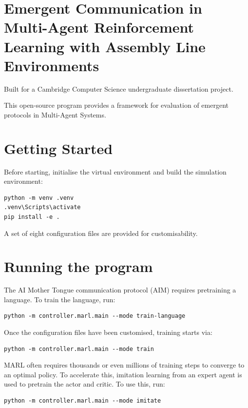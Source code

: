 \label{sec:README}
\section{Emergent Communication in Multi-Agent Reinforcement Learning with Assembly Line Environments}

Built for a Cambridge Computer Science undergraduate dissertation project.

This open-source program provides a framework for evaluation of emergent protocols in Multi-Agent Systems.

\section{Getting Started}

Before starting, initialise the virtual environment and build the simulation environment:

\begin{verbatim}
python -m venv .venv
.venv\Scripts\activate
pip install -e .
\end{verbatim}

A set of eight configuration files are provided for customisability.

\section{Running the program}

The AI Mother Tongue communication protocol (AIM) requires pretraining a language. To train the language, run:

\begin{verbatim}
python -m controller.marl.main --mode train-language
\end{verbatim}

Once the configuration files have been customised, training starts via:

\begin{verbatim}
python -m controller.marl.main --mode train
\end{verbatim}

MARL often requires thousands or even millions of training steps to converge to an optimal policy. To accelerate this, imitation learning from an expert agent is used to pretrain the actor and critic. To use this, run:

\begin{verbatim}
python -m controller.marl.main --mode imitate
\end{verbatim}


